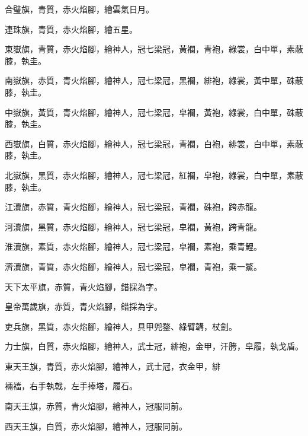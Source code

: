 \begin{pinyinscope}
 合璧旗，青質，赤火焰腳，繪雲氣日月。



 連珠旗，青質，赤火焰腳，繪五星。



 東嶽旗，青質，赤火焰腳，繪神人，冠七梁冠，黃襴，青袍，綠裳，白中單，素蔽膝，執圭。



 南嶽旗，赤質，青火焰腳，繪神人，冠七梁冠，黑襴，緋袍，綠裳，黃中單，硃蔽膝，執圭。



 中嶽旗，黃質，青火焰腳，繪神人，冠七梁冠，皁襴，黃袍，綠裳，白中單，硃蔽膝，執圭。



 西嶽旗，白質，赤火焰腳，繪神人，冠七梁冠，青襴，白袍，緋裳，白中單，素蔽膝，執圭。



 北嶽旗，黑質，赤火焰腳，繪神人，冠七梁冠，紅襴，皁袍，綠裳，白中單，素蔽膝，執圭。



 江瀆旗，赤質，青火焰腳，繪神人，冠七梁冠，青襴，硃袍，跨赤龍。



 河瀆旗，黑質，赤火焰腳，繪神人，冠七梁冠，皁襴，黃袍，跨青龍。



 淮瀆旗，素質，赤火焰腳，繪神人，冠七梁冠，皁襴，素袍，乘青鯉。



 濟瀆旗，青質，赤火焰腳，繪神人，冠七梁冠，皁襴，青袍，乘一鱉。



 天下太平旗，赤質，青火焰腳，錯採為字。



 皇帝萬歲旗，赤質，青火焰腳，錯採為字。



 吏兵旗，黑質，赤火焰腳，繪神人，具甲兜鍪、綠臂韝，杖劍。



 力士旗，白質，赤火焰腳，繪神人，武士冠，緋袍，金甲，汗胯，皁履，執戈盾。



 東天王旗，青質，赤火焰腳，繪神人，武士冠，衣金甲，緋



 裲襠，右手執戟，左手捧塔，履石。



 南天王旗，赤質，青火焰腳，繪神人，冠服同前。



 西天王旗，白質，赤火焰腳，繪神人，冠服同前。




\end{pinyinscope}
